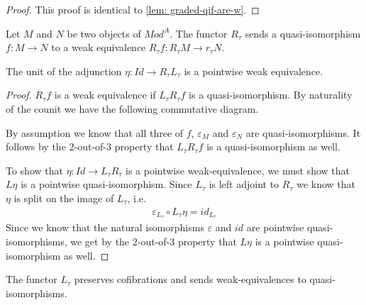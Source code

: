 \documentclass[../thesis.tex]{subfiles}
\begin{document}
            \begin{proof}
                This proof is identical to \ref{lem: graded-qif-are-w}.   
            \end{proof}

            \begin{lemma}
                Let $M$ and $N$ be two objects of $Mod^A$. The functor $R_\tau$ sends a quasi-isomorphism $f: M \rightarrow N$ to a weak equivalence $R_\tau f: R_\tau M \rightarrow r_\tau N$.

                The unit of the adjunction $\eta : Id \rightarrow R_\tau L_\tau$ is a pointwise weak equivalence.
            \end{lemma}

            \begin{proof}
                $R_\tau f$ is a weak equivalence if $L_\tau R_\tau f$ is a quasi-isomorphism. By naturality of the counit we have the following commutative diagram.
                \begin{center}
                \end{center}

                By assumption we know that all three of $f$, $\varepsilon_M$ and $\varepsilon_N$ are quasi-isomorphisms. It follows by the $2$-out-of-$3$ property that $L_\tau R_\tau f$ is a quasi-isomorphism as well.

                To show that $\eta : Id \rightarrow L_\tau R_\tau$ is a pointwise weak-equivalence, we must show that $L\eta$ is a pointwise quasi-isomorphism. Since $L_\tau$ is left adjoint to $R_\tau$ we know that $\eta$ is split on the image of $L_\tau$, i.e.
                \begin{align*}
                    \varepsilon_{L_\tau}\circ L_\tau\eta = id_{L_\tau}
                \end{align*}
                Since we know that the natural isomorphisms $\varepsilon$ and $id$ are pointwise quasi-isomorphisms, we get by the $2$-out-of-$3$ property that $L\eta$ is a pointwise quasi-isomorphism as well.
            \end{proof}

            \begin{lemma}
                The functor $L_\tau$ preserves cofibrations and sends weak-equivalences to quasi-isomorphisms.
            \end{lemma}
\end{document}

